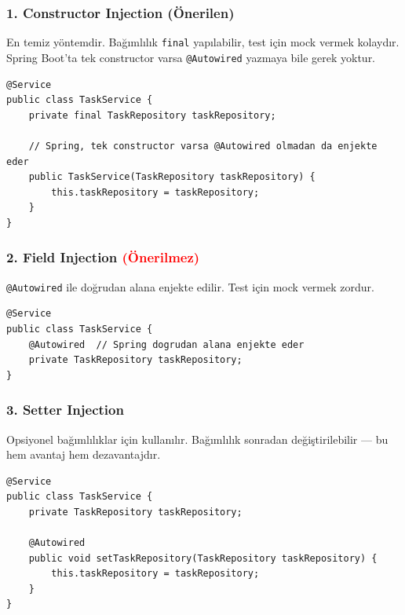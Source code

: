 \documentclass[11pt,a4paper]{article}
\begin{document}
\subsubsection*{1. Constructor Injection \textcolor{green!60!black}{(\"{O}nerilen)}}

En temiz y\"{o}ntemdir. Ba\u{g}{\i}ml{\i}l{\i}k \texttt{final} yap{\i}labilir, test i\c{c}in mock vermek kolayd{\i}r. Spring Boot'ta tek constructor varsa \texttt{@Autowired} yazmaya bile gerek yoktur.

\begin{lstlisting}[style=java]
@Service
public class TaskService {
    private final TaskRepository taskRepository;

    // Spring, tek constructor varsa @Autowired olmadan da enjekte eder
    public TaskService(TaskRepository taskRepository) {
        this.taskRepository = taskRepository;
    }
}
\end{lstlisting}

\subsubsection*{2. Field Injection \textcolor{red}{(\"{O}nerilmez)}}

\texttt{@Autowired} ile do\u{g}rudan alana enjekte edilir. Test i\c{c}in mock vermek zordur.

\begin{lstlisting}[style=java]
@Service
public class TaskService {
    @Autowired  // Spring dogrudan alana enjekte eder
    private TaskRepository taskRepository;
}
\end{lstlisting}

\subsubsection*{3. Setter Injection}

Opsiyonel ba\u{g}{\i}ml{\i}l{\i}klar i\c{c}in kullan{\i}l{\i}r. Ba\u{g}{\i}ml{\i}l{\i}k sonradan de\u{g}i\c{s}tirilebilir --- bu hem avantaj hem dezavantajd{\i}r.

\begin{lstlisting}[style=java]
@Service
public class TaskService {
    private TaskRepository taskRepository;

    @Autowired
    public void setTaskRepository(TaskRepository taskRepository) {
        this.taskRepository = taskRepository;
    }
}
\end{lstlisting}

\newpage
\end{document}

